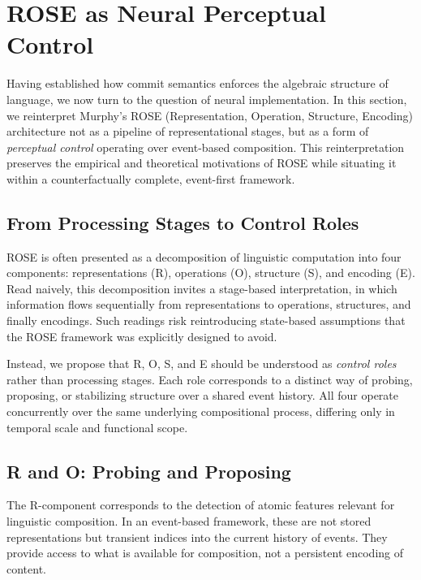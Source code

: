 \documentclass[11pt]{article}
\begin{document}
\section{ROSE as Neural Perceptual Control}
\label{sec:rose_control}

Having established how commit semantics enforces the algebraic structure of language, we now turn to the question of neural implementation. In this section, we reinterpret Murphy’s ROSE (Representation, Operation, Structure, Encoding) architecture not as a pipeline of representational stages, but as a form of \emph{perceptual control} operating over event-based composition. This reinterpretation preserves the empirical and theoretical motivations of ROSE while situating it within a counterfactually complete, event-first framework.

\subsection{From Processing Stages to Control Roles}

ROSE is often presented as a decomposition of linguistic computation into four components: representations (R), operations (O), structure (S), and encoding (E). Read naively, this decomposition invites a stage-based interpretation, in which information flows sequentially from representations to operations, structures, and finally encodings. Such readings risk reintroducing state-based assumptions that the ROSE framework was explicitly designed to avoid.

Instead, we propose that R, O, S, and E should be understood as \emph{control roles} rather than processing stages. Each role corresponds to a distinct way of probing, proposing, or stabilizing structure over a shared event history. All four operate concurrently over the same underlying compositional process, differing only in temporal scale and functional scope.

\subsection{R and O: Probing and Proposing}

The R-component corresponds to the detection of atomic features relevant for linguistic composition. In an event-based framework, these are not stored representations but transient indices into the current history of events. They provide access to what is available for composition, not a persistent encoding of content.
\end{document}
